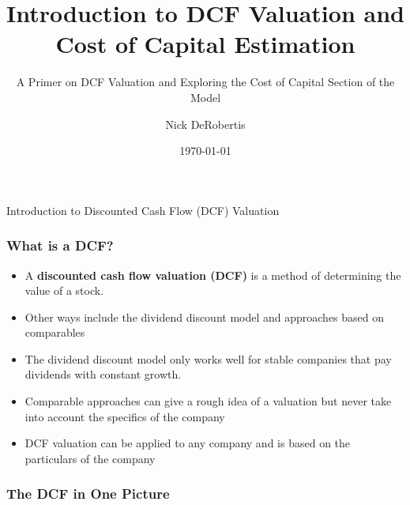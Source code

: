 \documentclass[handout, 11pt]{beamer}
\institute[UF]{\inst{1}
University of Florida\\
Department of Finance, Insurance, and Real Estate}
\begin{document}
\title[Intro DCF and Cost of Capital]{Introduction to DCF Valuation and Cost of Capital Estimation}
\subtitle{A Primer on DCF Valuation and Exploring the Cost of Capital Section of the Model}
\author[DeRobertis]{Nick DeRobertis}
\date{\today}
\begin{frame}
\titlepage
\label{title-frame}
\end{frame}
\begin{section}{Introduction to Discounted Cash Flow (DCF) Valuation}
\begin{frame}
\frametitle{What is a DCF?}
\begin{itemize}
\item A \textbf{discounted cash flow valuation (DCF)} is a method of determining the value of a stock.
\vfill
\item Other ways include the dividend discount model and approaches based on comparables
\vfill
\item The dividend discount model only works well for stable companies that pay dividends with constant growth.
\vfill
\item Comparable approaches can give a rough idea of a valuation but never take into account the specifics of the company
\vfill
\item DCF valuation can be applied to any company and is based on the particulars of the company
\end{itemize}
\end{frame}
\begin{frame}
\frametitle{The DCF in One Picture}
\begin{center}
\begin{adjustbox}{width=0.9\textwidth, height=0.8\textheight, keepaspectratio}
\end{adjustbox}
\end{center}
\end{frame}
\end{section}
\end{document}
